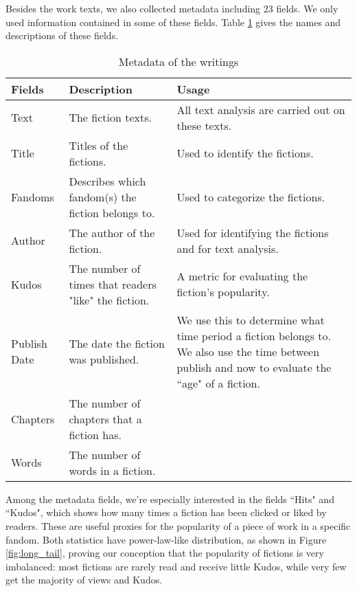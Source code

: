 \documentclass[a4paper]{article}
\begin{document}
Besides the work texts, we also collected metadata including 23 fields. We only used information contained in some of these fields. Table \ref{tab:metadata} gives the names and descriptions of these fields. 

\begin{table}[htp]
\caption{Metadata of the writings}
\begin{center}
\begin{tabular}[width=0.8\textwidth]{p{2cm}|p{4cm}|p{5cm}}
  \hline			
 Fields & Description & Usage\\ 
   \hline			
Text & The fiction texts. & All text analysis are carried out on these texts.\\\hline
Title & Titles of the fictions. & Used to identify the fictions. \\\hline
Fandoms & Describes which fandom(s) the fiction belongs to. & Used to categorize the fictions.\\\hline
Author & The author of the fiction. & Used for identifying the fictions and for text analysis. \\\hline
Kudos & The number of times that readers "like" the fiction. &  A metric for evaluating the fiction's popularity.\\\hline
Publish Date & The date the fiction was published. & We use this to determine what time period a fiction belongs to. We also use the time between publish and now to evaluate the ``age" of a fiction.\\\hline
Chapters & The number of chapters that a fiction has. \\\hline
Words & The number of words in a fiction.\\\hline

\hline
\end{tabular}
\end{center}
\label{tab:metadata}
\end{table}%

Among the metadata fields, we're especially interested in the fields ``Hits" and ``Kudos", which shows how many times a fiction has been clicked or liked by readers. These are useful proxies for the popularity of a piece of work in a specific fandom.
Both statistics have power-law-like distribution, as shown in  Figure \ref{fig:long_tail}, proving our conception that the popularity of fictions is very imbalanced: most fictions are rarely read and receive little Kudos, while very few get the majority of views and Kudos.
\end{document}
